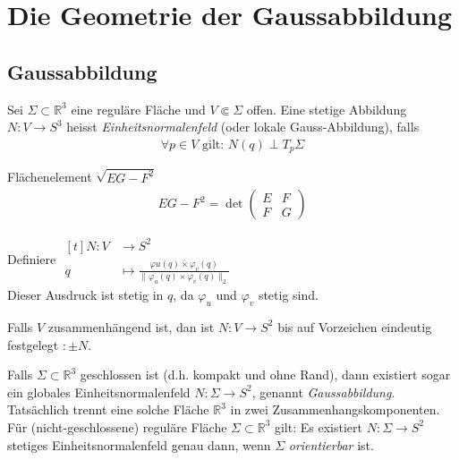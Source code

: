 \documentclass[../main.tex]{subfiles}
\begin{document}
\chapter{Die Geometrie der Gaussabbildung}

\section{Gaussabbildung}
\begin{definition}
    Sei $\Sigma \subset \mathbb{R}^{3}$ eine reguläre Fläche und $V \Subset \Sigma$ offen. Eine stetige Abbildung $N:V \to S^3$ heisst \emph{Einheitsnormalenfeld} (oder lokale Gauss-Abbildung), falls 
    \begin{align*}
        \forall p \in V \text{ gilt: } N(q)\perp T_{p}\Sigma
    \end{align*}
\end{definition}
\begin{zusatz}
    Flächenelement $\sqrt{EG-F^{2}}$
    \begin{align*}
        EG-F^{2} = \det\begin{pmatrix} E & F \\ F & G \end{pmatrix}
    \end{align*}
\end{zusatz}
\begin{existence}
    Definiere $\begin{aligned}[t]
        N : V & \to S^{2} \\
        q & \mapsto \frac{\varphi{u}(q) \times \varphi_{v}(q)}{\lVert \varphi_{u}(q) \times \varphi_{v}(q) \rVert_{2}} 
    \end{aligned}$ \qquad \\
    Dieser Ausdruck ist stetig in $q$, da $\varphi_{u}$ und $\varphi_{v}$ stetig sind.
\end{existence}
\begin{uniqueness}
    Falls $V$ zusammenhängend ist, dan ist $N:V \to S^{2}$ bis auf Vorzeichen eindeutig festgelegt $:\pm N$.
\end{uniqueness}
\begin{remark}
    Falls $\Sigma \subset \mathbb{R}^{3}$ geschlossen ist (d.h. kompakt und ohne Rand), dann existiert sogar ein globales Einheitsnormalenfeld $N:\Sigma \to S^{2}$, genannt \emph{Gaussabbildung}.
    Tatsächlich trennt eine solche Fläche $\mathbb{R}^{3}$ in zwei Zusammenhangskomponenten. Für (nicht-geschlossene) reguläre Fläche $\Sigma \subset \mathbb{R}^{3}$ gilt: Es existiert $N:\Sigma \to S^{2}$ stetiges Einheitsnormalenfeld genau dann,
    wenn $\Sigma$ \emph{orientierbar} ist.
\end{remark}
\end{document}
